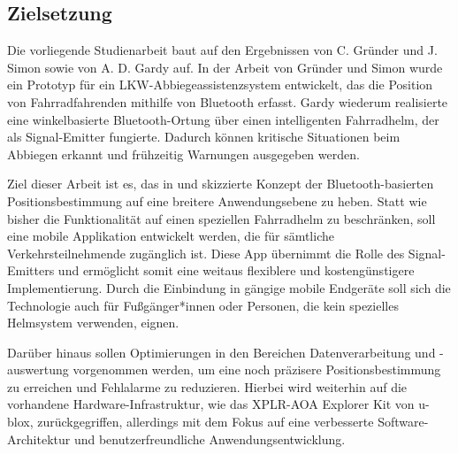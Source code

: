 \documentclass[a4paper, 12pt]{article} %
\begin{document}
\subsection{Zielsetzung}
\begin{spacing}{1.8}  %
    \fontsize{14pt}{15pt}\selectfont

    Die vorliegende Studienarbeit baut auf den Ergebnissen von C.
     Gründer und J. Simon\cite{grunder_simon_2024} sowie von A. D. Gardy\cite{gardy_andy_2023} auf.
      In der Arbeit von Gründer und Simon wurde ein Prototyp für ein LKW-Abbiegeassistenzsystem entwickelt, das die Position von Fahrradfahrenden mithilfe von Bluetooth erfasst. Gardy wiederum realisierte 
      eine winkelbasierte Bluetooth-Ortung über einen intelligenten Fahrradhelm, der als 
      Signal-Emitter fungierte. Dadurch können kritische Situationen beim Abbiegen erkannt und 
      frühzeitig Warnungen ausgegeben werden.

Ziel dieser Arbeit ist es, das in \cite{grunder_simon_2024} und \cite{gardy_andy_2023} skizzierte Konzept der Bluetooth-basierten 
Positionsbestimmung auf eine breitere Anwendungsebene zu heben. Statt wie bisher die 
Funktionalität auf einen speziellen Fahrradhelm zu beschränken, soll eine mobile Applikation 
entwickelt werden, die für sämtliche Verkehrsteilnehmende zugänglich ist. Diese App übernimmt
 die Rolle des Signal-Emitters und ermöglicht somit eine weitaus flexiblere und 
 kostengünstigere Implementierung. Durch die Einbindung in gängige mobile Endgeräte soll sich 
 die Technologie auch für
 Fußgänger*innen oder Personen, die kein spezielles Helmsystem 
 verwenden, eignen.

Darüber hinaus sollen Optimierungen in den Bereichen Datenverarbeitung 
und -auswertung vorgenommen werden, um eine noch präzisere 
Positionsbestimmung zu erreichen und Fehlalarme zu reduzieren. 
Hierbei wird weiterhin auf die vorhandene Hardware-Infrastruktur, 
wie das XPLR-AOA Explorer Kit von u-blox, zurückgegriffen, allerdings 
mit dem Fokus auf eine verbesserte Software-Architektur und benutzerfreundliche 
Anwendungsentwicklung. 


\end{spacing}
\end{document}
